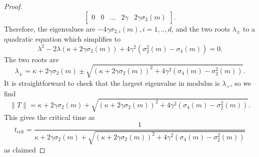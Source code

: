 \begin{proof}
\begin{equation*}
\begin{bmatrix}
    0 & 0& \dots & 2\gamma & 2\gamma \sigma_2(m)
\end{bmatrix}.
   \end{equation*} Therefore, the eigenvalues are $-4\gamma \sigma_{2,i}(m), i=1,..,d$, and the two roots  $\lambda_\pm$ to a quadratic equation which simplifies to \begin{equation*}
       \lambda^2-2\lambda(\kappa+2\gamma\sigma_2(m))+4\gamma^2(\sigma_2^2(m)-\sigma_4(m))=0.
   \end{equation*} The two roots are \begin{equation}
       \lambda_\pm=\kappa +2\gamma\sigma_2(m) \pm \sqrt{(\kappa+2\gamma\sigma_2(m))^2+4\gamma^2(\sigma_4(m)-\sigma_2^2(m))}.
   \end{equation} It is straightforward to check that the largest eigenvalue in modulus is $\lambda_+$, so we find \begin{equation*}
       \|T\|=\kappa +2\gamma\sigma_2(m) + \sqrt{(\kappa+2\gamma\sigma_2(m))^2+4\gamma^2(\sigma_4(m)-\sigma_2^2(m))}.
   \end{equation*} This gives the critical time as \begin{equation}
       t_\text{crit}= \frac{1}{\kappa +2\gamma\sigma_2(m) + \sqrt{(\kappa+2\gamma\sigma_2(m))^2+4\gamma^2(\sigma_4(m)-\sigma_2^2(m))}}
   \end{equation} as claimed\end{proof}

